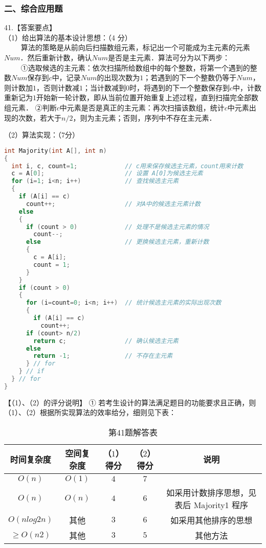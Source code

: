 \subsubsection{二、综合应用题}

41.【答案要点】 \\
（1）给出算法的基本设计思想：（4 分） \\
$\qquad$ 算法的策略是从前向后扫描数组元素，标记出一个可能成为主元素的元素$Num$．然后重新计数，确认$Num$是否是主元素．算法可分为以下两步： \\
$\qquad$ ①选取候选的主元素：依次扫描所给数组中的每个整数，将第一个遇到的整数$Num$保存到$c$中，记录$Num$的出现次数为$1$；若遇到的下一个整数仍等于$Num$，则计数加$1$，否则计数减$1$；当计数减到$0$时，将遇到的下一个整数保存到$c$中，计数重新记为$1$开始新一轮计数，即从当前位置开始重复上述过程，直到扫描完全部数组元素． 
②判断$c$中元素是否是真正的主元素：再次扫描该数组，统计$c$中元素出现的次数，若大于$n/2$，则为主元素；否则，序列中不存在主元素．

（2）算法实现：（7分）
\begin{lstlisting}[language=cpp]
int Majority(int A[], int n)
{ 
  int i, c, count=1;             // c用来保存候选主元素，count用来计数
  c = A[0];                      // 设置 A[0]为候选主元素
  for (i=1; i<n; i++)            // 查找候选主元素
  {
    if (A[i] == c)
      count++;                   // 对A中的候选主元素计数
    else
    {
      if (count > 0)             // 处理不是候选主元素的情况
        count--;
      else                       // 更换候选主元素，重新计数
      {
        c = A[i]; 
        count = 1; 
      }
    }
    if (count > 0)
    {
      for (i=count=0; i<n; i++)  // 统计候选主元素的实际出现次数
      {
        if (A[i] == c)
          count++; 
      if (count> n/2)
        return c;                // 确认候选主元素
      else
        return -1;               // 不存在主元素 
      } // for
    } // if
  } // for
}
\end{lstlisting}

【（1）、（2）的评分说明】
① 若考生设计的算法满足题目的功能要求且正确，则（1）、（2）根据所实现算法的效率给分，细则见下表： 
\begin{table}[ht]
\centering
\caption{第41题解答表}\label{CSN13_tab8}
\begin{tabular}{|c|c|c|c|c|}
\hline
时间复杂度 & 空间复杂度 & （$1$）得分 & （$2$）得分 & 说明  \\
\hline
$O(n)$ & $O(1)$ & $4$ & $7$ &  \\
\hline
$O(n)$ & $O(n)$ & $4$ & $6$ & 如采用计数排序思想，见表后 Majority1 程序  \\
\hline
$O(nlog2n)$ & 其他 & $3$ & $6$ & 如采用其他排序的思想  \\
\hline
$\geqslant O(n2)$ & 其他 & $3$ & $5$ & 其他方法  \\
\hline
\end{tabular}
\end{table}

